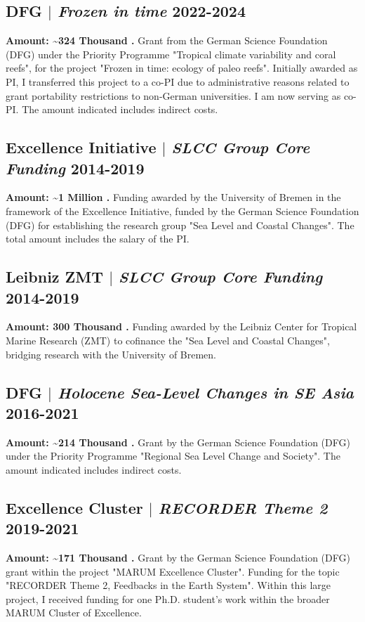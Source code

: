 \documentclass[11pt]{article}
\begin{document}
\subsection{DFG $|$ {\normalfont\textit{Frozen in time}} \hfill 2022-2024}
{\footnotesize \textbf{Amount: \textasciitilde324 Thousand \texteuro.} Grant from the German Science Foundation (DFG) under the Priority Programme "Tropical climate variability and coral reefs", for the project "Frozen in time: ecology of paleo reefs". Initially awarded as PI, I transferred this project to a co-PI due to administrative reasons related to grant portability restrictions to non-German universities. I am now serving as co-PI. The amount indicated includes indirect costs.}
\bigskip

\subsection{Excellence Initiative $|$ {\normalfont\textit{SLCC Group Core Funding}} \hfill 2014-2019}
{\footnotesize \textbf{Amount: \textasciitilde1 Million \texteuro.} Funding awarded by the University of Bremen in the framework of the Excellence Initiative, funded by the German Science Foundation (DFG) for establishing the research group "Sea Level and Coastal Changes". The total amount includes the salary of the PI.}
\bigskip

\subsection{Leibniz ZMT $|$ {\normalfont\textit{SLCC Group Core Funding}} \hfill 2014-2019}
{\footnotesize \textbf{Amount: 300 Thousand \texteuro.} Funding awarded by the Leibniz Center for Tropical Marine Research (ZMT) to cofinance the "Sea Level and Coastal Changes", bridging research with the University of Bremen.}
\bigskip

\subsection{DFG $|$ {\normalfont\textit{Holocene Sea-Level Changes in SE Asia}} \hfill 2016-2021}
{\footnotesize \textbf{Amount: \textasciitilde214 Thousand \texteuro.} Grant by the German Science Foundation (DFG) under the Priority Programme "Regional Sea Level Change and Society". The amount indicated includes indirect costs.}
\bigskip

\subsection{Excellence Cluster $|$ {\normalfont\textit{RECORDER Theme 2}} \hfill 2019-2021}
{\footnotesize \textbf{Amount: \textasciitilde171 Thousand \texteuro.} Grant by the German Science Foundation (DFG) grant within the project "MARUM Excellence Cluster". Funding for the topic "RECORDER Theme 2, Feedbacks in the Earth System". Within this large project, I received funding for one Ph.D. student's work within the broader MARUM Cluster of Excellence.}
\bigskip
\end{document}
